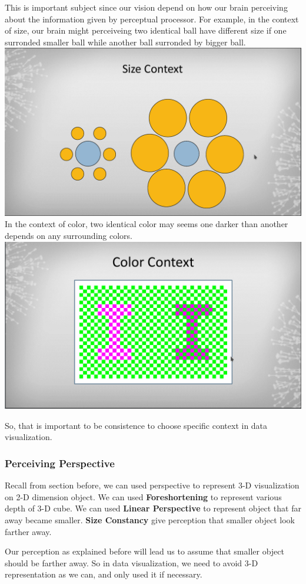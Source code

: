 \documentclass[11pt]{article}
\makeatletter
\def\maxwidth{\ifdim\Gin@nat@width>\linewidth\linewidth
    \else\Gin@nat@width\fi}
\let\Oldincludegraphics\includegraphics
\renewcommand{\includegraphics}[1]{\Oldincludegraphics[width=.8\maxwidth]{#1}}
\makeatother
\begin{document}
This is important subject since our vision depend on how our brain
perceiving about the information given by perceptual processor. For
example, in the context of size, our brain might perceiveing two
identical ball have different size if one surronded smaller ball while
another ball surronded by bigger ball.
\includegraphics{images/size_context.png} In the context of color, two
identical color may seems one darker than another depends on any
surrounding colors. \includegraphics{images/color_context.png}

So, that is important to be consistence to choose specific context in
data visualization.

    \subsubsection{Perceiving Perspective}\label{perceiving-perspective}

Recall from section before, we can used perspective to represent 3-D
visualization on 2-D dimension object. We can used
\textbf{Foreshortening} to represent various depth of 3-D cube. We can
used \textbf{Linear Perspective} to represent object that far away
became smaller. \textbf{Size Constancy} give perception that smaller
object look farther away.

Our perception as explained before will lead us to assume that smaller
object should be farther away. So in data visualization, we need to
avoid 3-D representation as we can, and only used it if necessary.


    
    
    
    
\end{document}
